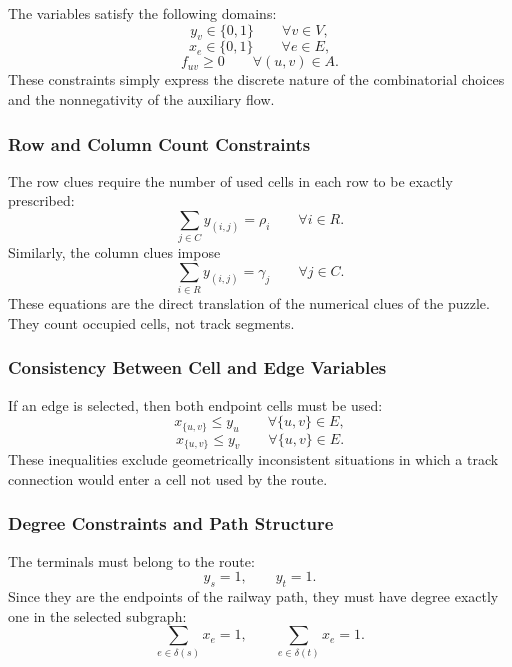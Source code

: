 The variables satisfy the following domains:
\[
    y_v \in \{0,1\}
    \qquad \forall v \in V,
\]
\[
    x_e \in \{0,1\}
    \qquad \forall e \in E,
\]
\[
    f_{uv} \geq 0
    \qquad \forall (u,v) \in A.
\]
These constraints simply express the discrete nature of the combinatorial choices and the nonnegativity of the auxiliary flow.

\subsubsection{Row and Column Count Constraints}

The row clues require the number of used cells in each row to be exactly prescribed:
\begin{equation}
    \sum_{j \in C} y_{(i,j)} = \rho_i
    \qquad \forall i \in R.
    \label{eq:row-count}
\end{equation}
Similarly, the column clues impose
\begin{equation}
    \sum_{i \in R} y_{(i,j)} = \gamma_j
    \qquad \forall j \in C.
    \label{eq:column-count}
\end{equation}
These equations are the direct translation of the numerical clues of the puzzle. They count occupied cells, not track segments.

\subsubsection{Consistency Between Cell and Edge Variables}

If an edge is selected, then both endpoint cells must be used:
\begin{equation}
    x_{\{u,v\}} \leq y_u
    \qquad \forall \{u,v\} \in E,
    \label{eq:edge-use-u}
\end{equation}
\begin{equation}
    x_{\{u,v\}} \leq y_v
    \qquad \forall \{u,v\} \in E.
    \label{eq:edge-use-v}
\end{equation}
These inequalities exclude geometrically inconsistent situations in which a track connection would enter a cell not used by the route.

\subsubsection{Degree Constraints and Path Structure}

The terminals must belong to the route:
\begin{equation}
    y_s = 1,
    \qquad
    y_t = 1.
    \label{eq:terminal-used}
\end{equation}
Since they are the endpoints of the railway path, they must have degree exactly one in the selected subgraph:
\begin{equation}
    \sum_{e \in \delta(s)} x_e = 1,
    \qquad
    \sum_{e \in \delta(t)} x_e = 1.
    \label{eq:terminal-degree}
\end{equation}


